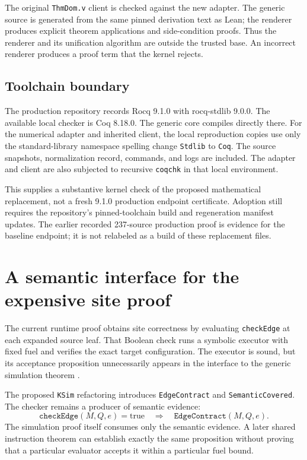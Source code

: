 \documentclass[11pt,letterpaper]{article}
\begin{document}
The original \texttt{ThmDom.v} client is checked against the new adapter.
The generic source is generated from the same pinned derivation text as Lean;
the renderer produces explicit theorem applications and side-condition proofs.
Thus the renderer and its unification algorithm are outside the trusted base.
An incorrect renderer produces a proof term that the kernel rejects.

\subsection{Toolchain boundary}

The production repository records Rocq 9.1.0 with rocq-stdlib 9.0.0. The available
local checker is Coq 8.18.0. The generic core compiles directly there. For the
numerical adapter and inherited client, the local reproduction copies use only
the standard-library namespace spelling change \texttt{Stdlib} to \texttt{Coq}.
The source snapshots, normalization record, commands, and logs are included.
The adapter and client are also subjected to recursive \texttt{coqchk} in that
local environment.

This supplies a substantive kernel check of the proposed mathematical
replacement, not a fresh 9.1.0 production endpoint certificate. Adoption still
requires the repository's pinned-toolchain build and regeneration manifest
updates. The earlier recorded 237-source production proof is evidence for the
baseline endpoint; it is not relabeled as a build of these replacement files.

\section{A semantic interface for the expensive site proof}

The current runtime proof obtains site correctness by evaluating
\texttt{checkEdge} at each expanded source leaf. That Boolean check runs a
symbolic executor with fixed fuel and verifies the exact target configuration.
The executor is sound, but its acceptance proposition unnecessarily appears in
the interface to the generic simulation theorem \cite{ksim,phase9}.

The proposed \texttt{KSim} refactoring introduces \texttt{EdgeContract} and
\texttt{SemanticCovered}. The checker remains a producer of semantic evidence:
\[
 \texttt{checkEdge}(M,Q,e)=\mathrm{true}
 \quad\Longrightarrow\quad
 \texttt{EdgeContract}(M,Q,e).
\]
The simulation proof itself consumes only the semantic evidence. A later shared
instruction theorem can establish exactly the same proposition without proving
that a particular evaluator accepts it within a particular fuel bound.
\end{document}
